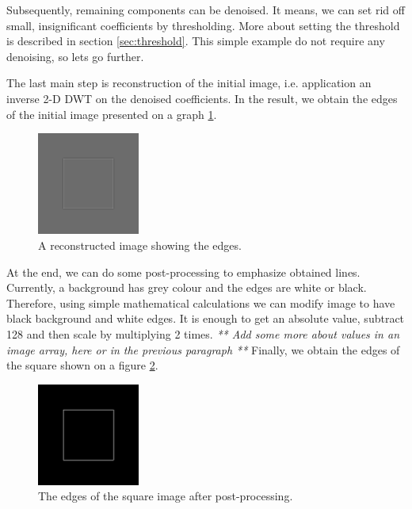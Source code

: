 Subsequently, remaining components can be denoised. It means, we can set rid off small, insignificant coefficients by thresholding. More about setting the threshold is described in section \ref{sec:threshold}. This simple example do not require any denoising, so lets go further.

The last main step is reconstruction of the initial image, i.e. application an inverse 2-D DWT on the denoised coefficients. In the result, we obtain the edges of the initial image presented on a graph \ref{fig:square_idwt}.

\begin{figure}[h]
	\centering
	\includegraphics[width=0.3\textwidth]{graphs/square_db2.png}
	\caption{A reconstructed image showing the edges.}
	\label{fig:square_idwt}
\end{figure}

At the end, we can do some post-processing to emphasize obtained lines. Currently, a background has grey colour and the edges are white or black. Therefore, using simple mathematical calculations we can modify image to have black background and white edges. It is enough to get an absolute value, subtract 128 and then scale by multiplying 2 times.
\textit{** Add some more about values in an image array, here or in the previous paragraph **}
Finally, we obtain the edges of the square shown on a figure \ref{fig:square_idwt_pp}.

\begin{figure}[h]
	\centering
	\includegraphics[width=0.3\textwidth]{graphs/square_db2_pp.png}
	\caption{The edges of the square image after post-processing.}
	\label{fig:square_idwt_pp}
\end{figure}

